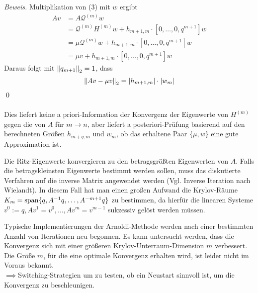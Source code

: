 \textit{Beweis.} Multiplikation von (3) mit $w$ ergibt 
\begin{align*}
Av &= A\mathcal{Q}^{(m)}w\\ 
&= \mathcal{Q}^{(m)}H^{(m)}w + h_{m+1,m}\cdot[0,\dotsc,0,q^{m+1}]w \\
&= \mu \mathcal{Q}^{(m)}w + h_{m+1,m}\cdot[0,\dotsc,0,q^{m+1}]w \\
&= \mu v + h_{m+1,m}\cdot[0,\dotsc,0,q^{m+1}]w
\end{align*}
Daraus folgt mit $\vertn{2}{q_{m+1}}_2 = 1$, dass
\begin{align*}\vertn{2}{Av-\mu v}_2 = |h_{m+1,m}|\cdot |w_m|\end{align*}
\qed \\ \\
Dies liefert keine a priori-Information der Konvergenz der Eigenwerte von $H^{(m)}$ gegen die von $A$ für $m\to n$, aber
liefert a posteriori-Prüfung basierend auf den berechneten Größen $h_{m+q,m}$ und $w_m$, ob das erhaltene Paar 
$\{\mu,w\}$ eine gute Approximation ist.
\begin{rembox}
  Die Ritz-Eigenwerte konvergieren zu den betragsgrößten Eigenwerten von $A$. Falls die betragskleinsten Eigenwerte 
  bestimmt werden sollen, muss das diskutierte Verfahren auf die inverse Matrix angewendet werden (Vgl. Inverse 
  Iteration nach Wielandt). In diesem Fall hat man einen großen Aufwand die Krylov-Räume 
  $K_m = \text{span}\{q,A^{-1}q,\dotsc,A^{-m+1}q\}$ zu bestimmen, da hierfür die linearen Systeme $v^0:=q, Av^1=v^0, 
  \dotsc, Av^m=v^{m-1}$ sukzessiv gelöst werden müssen.
\end{rembox}
\begin{rembox}
  Typische Implementierungen der Arnoldi-Methode werden nach einer bestimmten Anzahl von Iterationen neu begonnen.
  Es kann untersucht werden, dass die Konvergenz sich mit einer größeren Krylov-Unterraum-Dimension $m$ verbessert.
  Die Größe $m$, für die eine optimale Konvergenz erhalten wird, ist leider nicht im Voraus bekannt. \\
  $\implies$\glqq{}Switching\grqq{}-Strategien um zu testen, ob ein Neustart sinnvoll ist, 
  um die Konvergenz zu beschleunigen.
\end{rembox}

